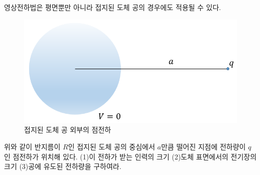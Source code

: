 영상전하법은 평면뿐만 아니라 접지된 도체 공의 경우에도 적용될 수 있다.
\begin{example} \label{ic4}
\begin{figure}[h]
\centering\includegraphics[scale=0.5]{Pictures/image_charge-4.PNG}
\caption{접지된 도체 공 외부의 점전하}
\end{figure}
위와 같이 반지름이 $R$인 접지된 도체 공의 중심에서 $a$만큼 떨어진 지점에 전하량이 $q$인 점전하가 위치해 있다. (1)이 전하가 받는 인력의 크기 (2)도체 표면에서의 전기장의 크기 (3)공에 유도된 전하량을 구하여라.
\end{example}

